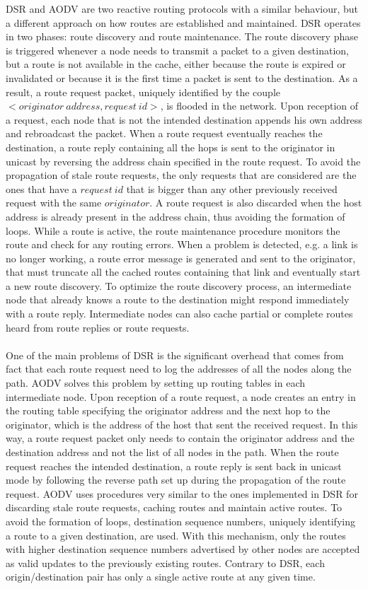 \gls{DSR} and \gls{AODV} are two reactive routing protocols with a similar behaviour, but a different approach on how routes are established and maintained.
\gls{DSR} operates in two phases: route discovery and route maintenance. The route discovery phase is triggered whenever a node needs to transmit a packet to a given destination, but a route is not available in the cache, either because the route is expired or invalidated or because it is the first time a packet is sent to the destination. As a result, a route request packet, uniquely identified by the couple $<originator \ address, request \ id>$, is flooded in the network. Upon reception of a request, each node that is not the intended destination appends his own address and rebroadcast the packet. When a route request eventually reaches the destination, a route reply containing all the hops is sent to the originator in unicast by reversing the address chain specified in the route request. To avoid the propagation of stale route requests, the only requests that are considered are the ones that have a $request \ id$ that is bigger than any other previously received request with the same $originator$. A route request is also discarded when the host address is already present in the address chain, thus avoiding the formation of loops. While a route is active, the route maintenance procedure monitors the route and check for any routing errors. When a problem is detected, e.g. a link is no longer working, a route error message is generated and sent to the originator, that must truncate all the cached routes containing that link and eventually start a new route discovery. To optimize the route discovery process, an intermediate node that already knows a route to the destination might respond immediately with a route reply. Intermediate nodes can also cache partial or complete routes heard from route replies or route requests. \\ \\
One of the main problems of \gls{DSR} is the significant overhead that comes from fact that each route request need to log the addresses of all the nodes along the path. \gls{AODV} solves this problem by setting up routing tables in each intermediate node. Upon reception of a route request, a node creates an entry in the routing table specifying the originator address and the next hop to the originator, which is the address of the host that sent the received request. In this way, a route request packet only needs to contain the originator address and the destination address and not the list of all nodes in the path. When the route request reaches the intended destination, a route reply is sent back in unicast mode by following the reverse path set up during the propagation of the route request. \gls{AODV} uses procedures very similar to the ones implemented in \gls{DSR} for discarding stale route requests, caching routes and maintain active routes. To avoid the formation of loops, destination sequence numbers, uniquely identifying a route to a given destination, are used. With this mechanism, only the routes with higher destination sequence numbers advertised by other nodes are accepted as valid updates to the previously existing routes. Contrary to \gls{DSR}, each origin/destination pair has only a single active route at any given time.

